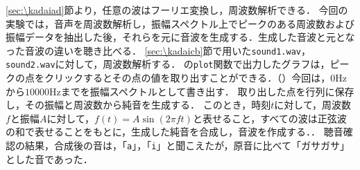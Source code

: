 \ref{sec:\kadaiad}節より，任意の波はフーリエ変換し，周波数解析できる．
今回の実験では，音声を周波数解析し，振幅スペクトル上でピークのある周波数および振幅データを抽出した後，それらを元に音波を生成する．生成した音波と元となった音波の違いを聴き比べる．
\method
\ref{sec:\kadaicb}節で用いた\texttt{sound1.wav}，\texttt{sound2.wav}に対して，周波数解析する．
\matlab の\texttt{plot}関数で出力したグラフは，ピークの点をクリックするとその点の値を取り出すことができる．（）今回は，\(0\textrm{Hz}\)から\(10000\textrm{Hz}\)までを振幅スペクトルとして書き出す．
取り出した点を行列に保存し，その振幅と周波数から純音を生成する．
このとき，時刻\(t\)に対して，周波数\(f\)と振幅\(A\)に対して，\(f(t) = A\sin(2\pi ft)\)と表せること，すべての波は正弦波の和で表せることをもとに，生成した純音を合成し，音波を作成する．\scall{}．
\result
聴音確認の結果，合成後の音は，「\texttt{a}」，「\texttt{i}」と聞こえたが，原音に比べて「ガサガサ」とした音であった．

